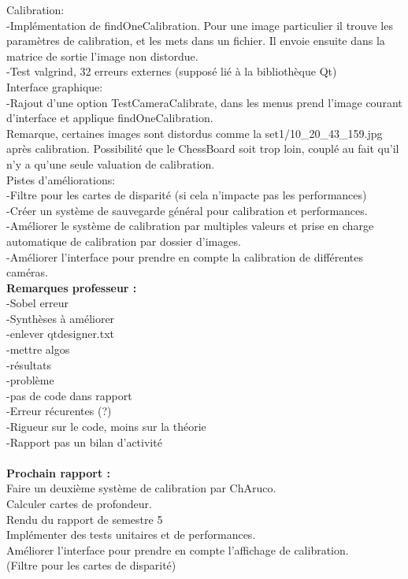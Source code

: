 \documentclass{article}
\begin{document}
Calibration:\\
    -Implémentation de findOneCalibration. Pour une image particulier il trouve les paramètres de calibration, et les mets dans un fichier. Il envoie ensuite dans la matrice de sortie l'image non distordue.\\
    -Test valgrind, 32 erreurs externes (supposé lié à la bibliothèque Qt)\\

Interface graphique:\\
    -Rajout d'une option TestCameraCalibrate, dans les menus prend l'image courant d'interface et applique findOneCalibration.\\
Remarque, certaines images sont distordus comme la set1/10\_20\_43\_159.jpg après calibration. Possibilité que le ChessBoard soit trop loin, couplé au fait qu'il n'y a qu'une seule valuation de calibration.
\\

Pistes d'améliorations:\\
    -Filtre pour les cartes de disparité (si cela n'impacte pas les performances)\\
    -Créer un système de sauvegarde général pour calibration et performances.\\
    -Améliorer le système de calibration par multiples valeurs et prise en charge automatique de calibration par dossier d'images.\\
    -Améliorer l'interface pour prendre en compte la calibration de différentes caméras.\\

\textbf{Remarques professeur :}\\
-Sobel erreur\\
-Synthèses à améliorer\\
-enlever qtdesigner.txt\\
-mettre algos\\
-résultats\\
-problème\\
-pas de code dans rapport\\
-Erreur récurentes (?)\\
-Rigueur sur le code, moins sur la théorie\\
-Rapport pas un bilan d'activité\\
\\

\textbf{Prochain rapport :}\\
Faire un deuxième système de calibration par ChAruco.\\
Calculer cartes de profondeur.\\
Rendu du rapport de semestre 5\\
Implémenter des tests unitaires et de performances.\\
Améliorer l'interface pour prendre en compte l'affichage de calibration.\\
(Filtre pour les cartes de disparité)\\
\\\\
\end{document}
